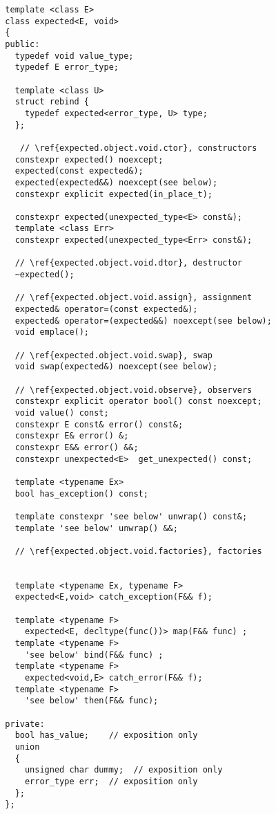 \documentclass[a4paper,10pt]{article}
\begin{document}
\begin{lstlisting}
  template <class E>
  class expected<E, void>
  {
  public:
    typedef void value_type;
    typedef E error_type;
    
    template <class U>
    struct rebind {
      typedef expected<error_type, U> type;
    };
    
     // \ref{expected.object.void.ctor}, constructors
    constexpr expected() noexcept;
    expected(const expected&);
    expected(expected&&) noexcept(see below);
    constexpr explicit expected(in_place_t);     
      
    constexpr expected(unexpected_type<E> const&);
    template <class Err> 
    constexpr expected(unexpected_type<Err> const&);

    // \ref{expected.object.void.dtor}, destructor
    ~expected();

    // \ref{expected.object.void.assign}, assignment
    expected& operator=(const expected&);
    expected& operator=(expected&&) noexcept(see below);
    void emplace();

    // \ref{expected.object.void.swap}, swap
    void swap(expected&) noexcept(see below);

    // \ref{expected.object.void.observe}, observers
    constexpr explicit operator bool() const noexcept;
    void value() const;
    constexpr E const& error() const&;
    constexpr E& error() &;
    constexpr E&& error() &&;
    constexpr unexpected<E>  get_unexpected() const;
    
    template <typename Ex>
    bool has_exception() const;
    
    template constexpr 'see below' unwrap() const&;
    template 'see below' unwrap() &&;

    // \ref{expected.object.void.factories}, factories


    template <typename Ex, typename F>
    expected<E,void> catch_exception(F&& f);

    template <typename F>
      expected<E, decltype(func())> map(F&& func) ;
    template <typename F>
      'see below' bind(F&& func) ;
    template <typename F>
      expected<void,E> catch_error(F&& f);
    template <typename F>
      'see below' then(F&& func);

  private:
    bool has_value;    // exposition only
    union
    {
      unsigned char dummy;  // exposition only
      error_type err;  // exposition only
    };
  };

\end{lstlisting}
\end{document}
